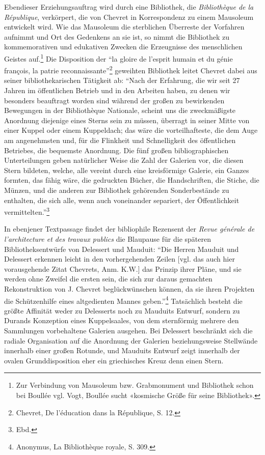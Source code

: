 Ebendieser Erziehungsauftrag wird durch eine Bibliothek, die
\emph{Bibliothèque de la République}, verkörpert, die von Chevret in
Korrespondenz zu einem Mausoleum entwickelt wird. Wie das Mausoleum die
sterblichen Überreste der Vorfahren aufnimmt und Ort des Gedenkens an
sie ist, so nimmt die Bibliothek zu kommemorativen und edukativen
Zwecken die Erzeugnisse des menschlichen Geistes auf.\footnote{Zur
  Verbindung von Mausoleum bzw. Grabmonument und Bibliothek schon bei
  Boullée vgl. Vogt, Boullée sucht «kosmische Größe für seine
  Bibliothek».} Die Disposition der \enquote{la gloire de l'esprit
humain et du génie françois, la patrie reconnaissante}\footnote{Chevret,
  De l'éducation dans la République, S. 12.} geweihten Bibliothek leitet
Chevret dabei aus seiner bibliothekarischen Tätigkeit ab: \enquote{Nach
der Erfahrung, die wir seit 27 Jahren im öffentlichen Betrieb und in den
Arbeiten haben, zu denen wir besonders beauftragt worden sind während
der großen zu bewirkenden Bewegungen in der Bibliothèque Nationale,
scheint uns die zweckmäßigste Anordnung diejenige eines Sterns sein zu
müssen, überragt in seiner Mitte von einer Kuppel oder einem Kuppeldach;
das wäre die vorteilhafteste, die dem Auge am angenehmsten und, für die
Flinkheit und Schnelligkeit des öffentlichen Betriebes, die bequemste
Anordnung. Die fünf großen bibliographischen Unterteilungen geben
natürlicher Weise die Zahl der Galerien vor, die diesen Stern bildeten,
welche, alle vereint durch eine kreisförmige Galerie, ein Ganzes
formten, das fähig wäre, die gedruckten Bücher, die Handschriften, die
Stiche, die Münzen, und die anderen zur Bibliothek gehörenden
Sonderbestände zu enthalten, die sich alle, wenn auch voneinander
separiert, der Öffentlichkeit vermittelten.}\footnote{Ebd.}

In ebenjener Textpassage findet der bibliophile Rezensent der
\emph{Revue générale de l'architecture et des travaux publics} die
Blaupause für die späteren Bibliotheksentwürfe von Delessert und
Mauduit: \enquote{Die Herren Mauduit und Delessert erkennen leicht in
den vorhergehenden Zeilen {[}vgl. das auch hier vorausgehende Zitat
Chevrets, Anm. K.W.{]} das Prinzip ihrer Pläne, und sie werden ohne
Zweifel die ersten sein, die sich zur daraus gemachten Rekonstruktion
von J. Chevret beglückwünschen können, da sie ihren Projekten die
Schützenhilfe eines altgedienten Mannes geben.}\footnote{Anonymus, La
  Bibliothèque royale, S. 309.} Tatsächlich besteht die größte Affinität
weder zu Delesserts noch zu Mauduits Entwurf, sondern zu Durands
Konzeption eines Kuppelsaales, von dem sternförmig mehrere den
Sammlungen vorbehaltene Galerien ausgehen. Bei Delessert beschränkt sich
die radiale Organisation auf die Anordnung der Galerien beziehungsweise
Stellwände innerhalb einer großen Rotunde, und Mauduits Entwurf zeigt
innerhalb der ovalen Grunddisposition eher ein griechisches Kreuz denn
einen Stern.

